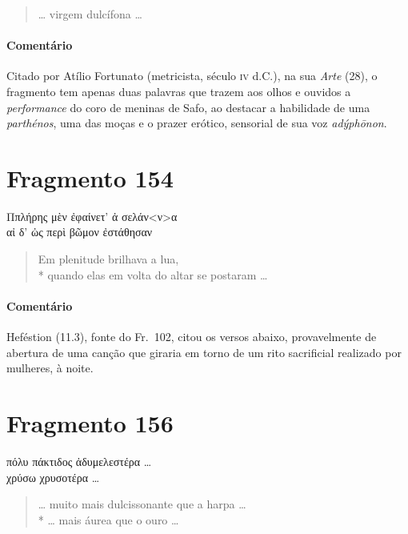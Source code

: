 {\begin{verse}
\ldots{} virgem dulcífona \ldots{}
\end{verse}

{\paragraph{Comentário} Citado por Atílio Fortunato (metricista, século \textsc{iv} d.C.), na sua \textit{Arte} (28), o fragmento tem apenas duas palavras que trazem aos olhos e ouvidos a \textit{performance} do coro de meninas de Safo, ao destacar a habilidade de uma \textit{parthénos}, uma das moças e o prazer erótico, sensorial de sua voz \textit{adýphōnon}.}



\section{Fragmento 154}

\begin{gkverse}
Ππλήρης μὲν ἐφαίνετ’ ἀ σελάν<ν>α\\
αἰ δ’ ὠς περὶ βῶμον ἐστάθησαν
\end{gkverse}

\begin{verse}
Em plenitude brilhava a lua, \\*
quando elas em volta do altar se postaram \ldots{}
\end{verse}

{\paragraph{Comentário} Heféstion (11.3), fonte do Fr.~102, citou os versos abaixo, provavelmente de abertura
de uma canção que giraria em torno de um rito sacrificial realizado
por mulheres, à noite.}


\section{Fragmento 156}

\begin{gkverse}
πόλυ πάκτιδος ἀδυμελεστέρα \ldots{}\\
χρύσω χρυσοτέρα \ldots{}
\end{gkverse}

\begin{verse}
\ldots{} muito mais dulcissonante que a harpa \ldots{}\\*
\ldots{} mais áurea que o ouro \ldots{}
\end{verse}

}
